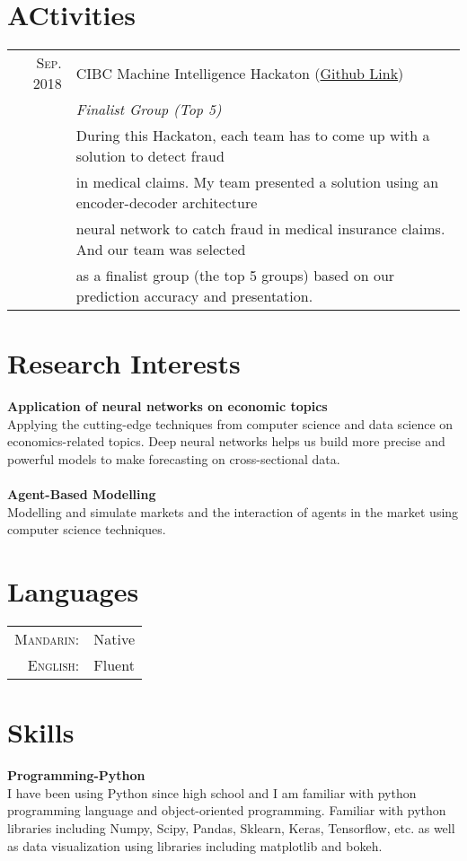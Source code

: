 \documentclass[a4paper,10pt]{article}
\begin{document}
\section{ACtivities}
\begin{tabular}{rl}
    \textsc{Sep.} 2018 & CIBC Machine Intelligence Hackaton (\href{https://github.com/TianyuDu/CIBC-MACHINE-INTELLIGENCE-HACKATHON}{Github Link}) \\
    & \emph{Finalist Group (Top 5)} \\
    & \quad During this Hackaton, each team has to come up with a solution to detect fraud \\ 
    & in medical claims. My team presented a solution using an encoder-decoder architecture \\
    & neural network to catch fraud in medical insurance claims. And our team was selected \\ 
    & as a finalist group (the top 5 groups) based on our prediction accuracy and presentation.
\end{tabular}

\section{Research Interests}
     \textbf{Application of neural networks on economic topics} \\
     Applying the cutting-edge techniques from computer science and data science on economics-related topics. Deep neural networks helps us build more precise and powerful models to make forecasting on cross-sectional data. \\
     \quad \\
     \textbf{Agent-Based Modelling} \\
     Modelling and simulate markets and the interaction of agents in the market using computer science techniques.

\section{Languages}
\begin{tabular}{rl}
 \textsc{Mandarin:}&Native\\
\textsc{English:}&Fluent\\
\end{tabular}


\section{Skills}
    \textbf{Programming-Python} \\
    I have been using Python since high school and I am familiar with python programming language and object-oriented programming. Familiar with python libraries including Numpy, Scipy, Pandas, Sklearn, Keras, Tensorflow, etc. as well as data visualization using libraries including matplotlib and bokeh.
    
\end{document}
